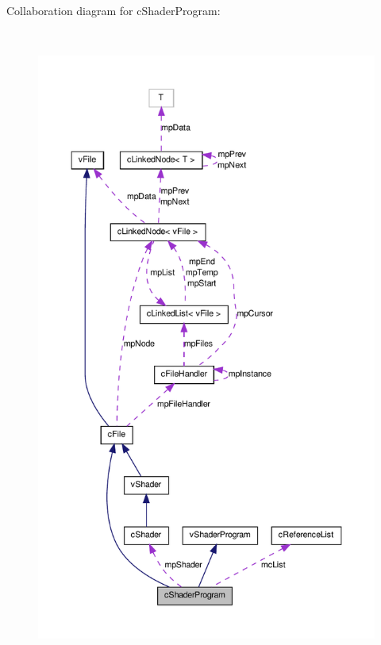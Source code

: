 Collaboration diagram for cShaderProgram:
\nopagebreak
\begin{figure}[H]
\begin{center}
\leavevmode
\includegraphics[height=600pt]{classc_shader_program__coll__graph}
\end{center}
\end{figure}
